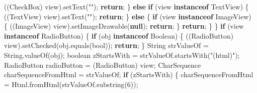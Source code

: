 \documentclass[
]{article}
\newenvironment{Shaded}{}{}
\newcommand{\BuiltInTok}[1]{\textcolor[rgb]{0.00,0.50,0.00}{#1}}
\newcommand{\ControlFlowTok}[1]{\textcolor[rgb]{0.00,0.44,0.13}{\textbf{#1}}}
\newcommand{\DataTypeTok}[1]{\textcolor[rgb]{0.56,0.13,0.00}{#1}}
\newcommand{\DecValTok}[1]{\textcolor[rgb]{0.25,0.63,0.44}{#1}}
\newcommand{\FunctionTok}[1]{\textcolor[rgb]{0.02,0.16,0.49}{#1}}
\newcommand{\KeywordTok}[1]{\textcolor[rgb]{0.00,0.44,0.13}{\textbf{#1}}}
\newcommand{\NormalTok}[1]{#1}
\newcommand{\OperatorTok}[1]{\textcolor[rgb]{0.40,0.40,0.40}{#1}}
\newcommand{\StringTok}[1]{\textcolor[rgb]{0.25,0.44,0.63}{#1}}
\begin{document}
\begin{Shaded}
\begin{Highlighting}[]
                \OperatorTok{((}\NormalTok{CheckBox}\OperatorTok{)}\NormalTok{ view}\OperatorTok{).}\FunctionTok{setText}\OperatorTok{(}\StringTok{""}\OperatorTok{);}
                \ControlFlowTok{return}\OperatorTok{;}
            \OperatorTok{\}} \ControlFlowTok{else} \ControlFlowTok{if} \OperatorTok{(}\NormalTok{view }\KeywordTok{instanceof}\NormalTok{ TextView}\OperatorTok{)} \OperatorTok{\{}
                \OperatorTok{((}\NormalTok{TextView}\OperatorTok{)}\NormalTok{ view}\OperatorTok{).}\FunctionTok{setText}\OperatorTok{(}\StringTok{""}\OperatorTok{);}
                \ControlFlowTok{return}\OperatorTok{;}
            \OperatorTok{\}} \ControlFlowTok{else} \OperatorTok{\{}
                \ControlFlowTok{if} \OperatorTok{(}\NormalTok{view }\KeywordTok{instanceof} \BuiltInTok{ImageView}\OperatorTok{)} \OperatorTok{\{}
                    \OperatorTok{((}\BuiltInTok{ImageView}\OperatorTok{)}\NormalTok{ view}\OperatorTok{).}\FunctionTok{setImageDrawable}\OperatorTok{(}\KeywordTok{null}\OperatorTok{);}
                    \ControlFlowTok{return}\OperatorTok{;}
                \OperatorTok{\}}
                \ControlFlowTok{return}\OperatorTok{;}
            \OperatorTok{\}}
        \OperatorTok{\}}
        \ControlFlowTok{if} \OperatorTok{(}\NormalTok{view }\KeywordTok{instanceof}\NormalTok{ RadioButton}\OperatorTok{)} \OperatorTok{\{}
            \ControlFlowTok{if} \OperatorTok{(}\NormalTok{obj }\KeywordTok{instanceof} \BuiltInTok{Boolean}\OperatorTok{)} \OperatorTok{\{}
                \OperatorTok{((}\NormalTok{RadioButton}\OperatorTok{)}\NormalTok{ view}\OperatorTok{).}\FunctionTok{setChecked}\OperatorTok{(}\NormalTok{obj}\OperatorTok{.}\FunctionTok{equals}\OperatorTok{(}\NormalTok{bool}\OperatorTok{));}
                \ControlFlowTok{return}\OperatorTok{;}
            \OperatorTok{\}}
            \BuiltInTok{String}\NormalTok{ strValueOf }\OperatorTok{=} \BuiltInTok{String}\OperatorTok{.}\FunctionTok{valueOf}\OperatorTok{(}\NormalTok{obj}\OperatorTok{);}
            \DataTypeTok{boolean}\NormalTok{ zStartsWith }\OperatorTok{=}\NormalTok{ strValueOf}\OperatorTok{.}\FunctionTok{startsWith}\OperatorTok{(}\StringTok{"(html)"}\OperatorTok{);}
\NormalTok{            RadioButton radioButton }\OperatorTok{=} \OperatorTok{(}\NormalTok{RadioButton}\OperatorTok{)}\NormalTok{ view}\OperatorTok{;}
            \BuiltInTok{CharSequence}\NormalTok{ charSequenceFromHtml }\OperatorTok{=}\NormalTok{ strValueOf}\OperatorTok{;}
            \ControlFlowTok{if} \OperatorTok{(}\NormalTok{zStartsWith}\OperatorTok{)} \OperatorTok{\{}
\NormalTok{                charSequenceFromHtml }\OperatorTok{=}\NormalTok{ Html}\OperatorTok{.}\FunctionTok{fromHtml}\OperatorTok{(}\NormalTok{strValueOf}\OperatorTok{.}\FunctionTok{substring}\OperatorTok{(}\DecValTok{6}\OperatorTok{));}

\end{Highlighting}
\end{Shaded}
\end{document}
